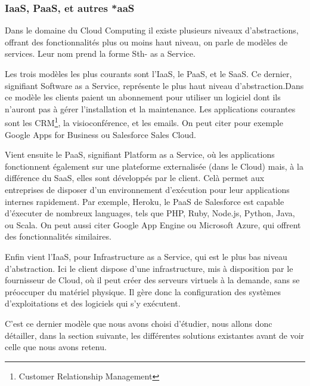 \documentclass{report}
\begin{document}
\subsubsection{IaaS, PaaS, et autres *aaS}
Dans le domaine du Cloud Computing il existe plusieurs niveaux d'abstractions, offrant des fonctionnalités plus ou moins haut niveau, on parle de modèles de services. Leur nom prend la forme Sth- as a Service.

Les trois modèles les plus courants sont l'IaaS, le PaaS, et le SaaS. Ce dernier, signifiant Software as a Service, représente le plus haut niveau d'abstraction.\newline Dans ce modèle les clients paient un abonnement pour utiliser un logiciel dont ils n'auront pas à gérer l'installation et la maintenance. Les applications courantes sont les CRM\footnote{Customer Relationship Management}, la visioconférence, et les emails. On peut citer pour exemple Google Apps for Business ou Salesforce Sales Cloud.

Vient ensuite le PaaS, signifiant Platform as a Service, où les applications fonctionnent également sur une plateforme externalisée (dans le Cloud) mais, à la différence du SaaS, elles sont développés par le client.\newline
Celà permet aux entreprises de disposer d'un environnement d'exécution pour leur applications internes rapidement. Par exemple, Heroku, le PaaS de Salesforce est capable d'éxecuter de nombreux languages, tels que PHP, Ruby, Node.js, Python, Java, ou Scala. On peut aussi citer Google App Engine ou Microsoft Azure, qui offrent des fonctionnalités similaires.

Enfin vient l'IaaS, pour Infrastructure as a Service, qui est le plus bas niveau d'abstraction. Ici le client dispose d'une infrastructure, mis à disposition par le fournisseur de Cloud, où il peut créer des serveurs virtuels à la demande, sans se préoccuper du matériel physique. Il gère donc la configuration des systèmes d'exploitations et des logiciels qui s'y exécutent.

C'est ce dernier modèle que nous avons choisi d'étudier, nous allons donc détailler, dans la section suivante, les différentes solutions existantes avant de voir celle que nous avons retenu.
\end{document}
